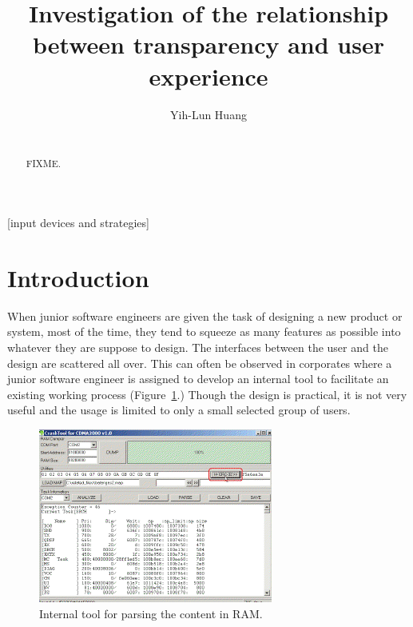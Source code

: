 \documentclass{acm_proc_article-sp}
\begin{document}
\title{Investigation of the relationship between transparency and user
  experience}

\author{
\alignauthor Yih-Lun Huang\\
\\
}

\maketitle
\begin{abstract}
FIXME.
\end{abstract}

[input devices and strategies]



\section{Introduction}
When junior software engineers are given the task of designing a new
product or system, most of the time, they tend to squeeze as many
features as possible into whatever they are suppose to design. The
interfaces between the user and the design are scattered all
over. This can often be observed in corporates where a junior software
engineer is assigned to develop an internal tool to facilitate an
existing working process (Figure~\ref{fig:featureful}.) Though the
design is practical, it is not very useful and the usage is limited to
only a small selected group of users.

\begin{figure}[!t]
\centering
\includegraphics[width=.7\columnwidth]{featureful}
\caption{Internal tool for parsing the content in RAM.}
\label{fig:featureful}
\end{figure}
\end{document}
